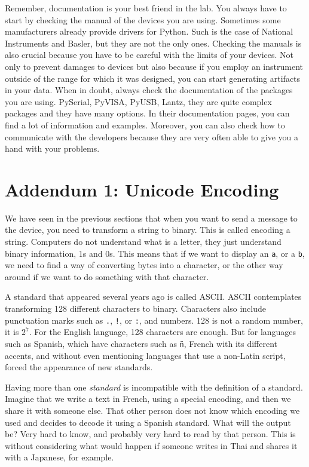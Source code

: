 Remember, documentation is your best friend in the lab. You always have to start by checking the manual of the devices you are using. Sometimes some manufacturers already provide drivers for Python. Such is the case of National Instruments and Basler, but they are not the only ones. Checking the manuals is also crucial because you have to be careful with the limits of your devices. Not only to prevent damages to devices but also because if you employ an instrument outside of the range for which it was designed, you can start generating artifacts in your data. When in doubt, always check the documentation of the packages you are using. PySerial, PyVISA, PyUSB, Lantz, they are quite complex packages and they have many options. In their documentation pages, you can find a lot of information and examples. Moreover, you can also check how to communicate with the developers because they are very often able to give you a hand with your problems.

\section{Addendum 1: Unicode Encoding}\label{section:unicode}
We have seen in the previous sections that when you want to send a message to the device, you need to transform a string to binary. This is called encoding a string. Computers do not understand what is a letter, they just understand binary information, 1s and 0s. This means that if we want to display an \texttt{a}, or a \texttt{b}, we need to find a way of converting bytes into a character, or the other way around if we want to do something with that character.

A standard that appeared several years ago is called ASCII. ASCII contemplates transforming 128 different characters to binary. Characters also include punctuation marks such as \texttt{.}, \texttt{!}, or \texttt{:}, and numbers. 128 is not a random number, it is $2^7$. For the English language, 128 characters are enough. But for languages such as Spanish, which have characters such as \texttt{ñ}, French with its different accents, and without even mentioning languages that use a non-Latin script, forced the appearance of new standards.

Having more than one \textit{standard} is incompatible with the definition of a standard. Imagine that we write a text in French, using a special encoding, and then we share it with someone else. That other person does not know which encoding we used and decides to decode it using a Spanish standard. What will the output be? Very hard to know, and probably very hard to read by that person. This is without considering what would happen if someone writes in Thai and shares it with a Japanese, for example.

